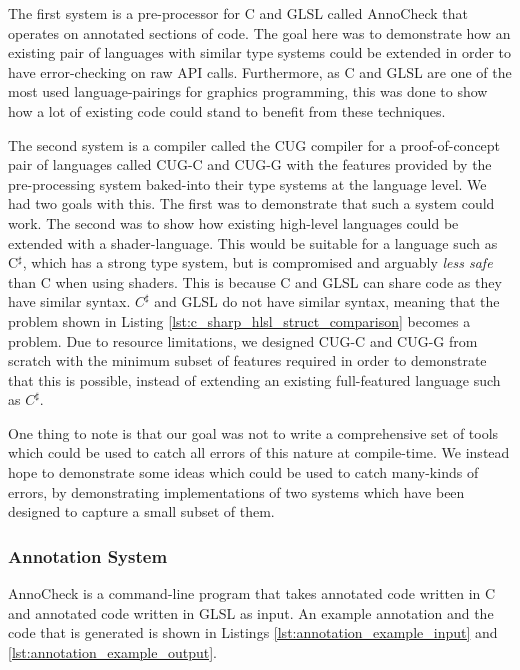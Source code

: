 \documentclass[a4paper,12pt,twoside,openright]{report}
\begin{document}
The first system is a pre-processor for C and GLSL called AnnoCheck that
operates on annotated sections of code. The goal here was to demonstrate how an
existing pair of languages with similar type systems could be extended in order
to have error-checking on raw API calls. Furthermore, as C and GLSL are one of
the most used language-pairings for graphics programming, this was done to show
how a lot of existing code could stand to benefit from these techniques.

The second system is a compiler called the CUG compiler for a proof-of-concept
pair of languages called CUG-C and CUG-G with the features provided by the
pre-processing system baked-into their type systems at the language level. We
had two goals with this. The first was to demonstrate that such a system could
work. The second was to show how existing high-level languages could be
extended with a shader-language. This would be suitable for a language such as
C$^\sharp$, which has a strong type system, but is compromised and arguably
\textit{less safe} than C when using shaders. This is because C and GLSL can
share code as they have similar syntax. $C^\sharp$ and GLSL do not have similar
syntax, meaning that the problem shown in Listing
\ref{lst:c_sharp_hlsl_struct_comparison} becomes a problem. Due to resource
limitations, we designed CUG-C and CUG-G from scratch with the minimum
subset of features required in order to demonstrate that this is possible,
instead of extending an existing full-featured language such as $C^\sharp$.

One thing to note is that our goal was not to write a comprehensive set of
tools which could be used to catch all errors of this nature at compile-time.
We instead hope to demonstrate some ideas which could be used to catch
many-kinds of errors, by demonstrating implementations of two systems which
have been designed to capture a small subset of them.

\subsubsection{Annotation System}

AnnoCheck is a command-line program that takes annotated code written in C and
annotated code written in GLSL as input. An example annotation and the code
that is generated is shown in Listings \ref{lst:annotation_example_input} and
\ref{lst:annotation_example_output}.
\end{document}

